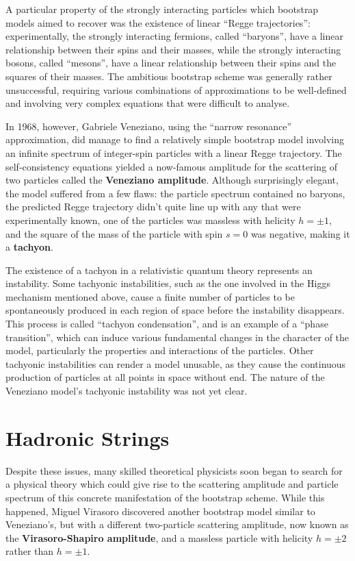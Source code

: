 \documentclass[12pt]{article}
\begin{document}
A particular property of the strongly interacting particles which bootstrap models aimed to recover was the existence of linear ``Regge trajectories'': experimentally, the strongly interacting fermions, called ``baryons'', have a linear relationship between their spins and their masses, while the strongly interacting bosons, called ``mesons'', have a linear relationship between their spins and the squares of their masses. The ambitious bootstrap scheme was generally rather unsuccessful, requiring various combinations of approximations to be well-defined and involving very complex equations that were difficult to analyse.
\newline

In 1968, however, Gabriele Veneziano, using the ``narrow resonance'' approximation, did manage to find a relatively simple bootstrap model involving an infinite spectrum of integer-spin particles with a linear Regge trajectory. The self-consistency equations yielded a now-famous amplitude for the scattering of two particles called the \textbf{Veneziano amplitude}. Although surprisingly elegant, the model suffered from a few flaws: the particle spectrum contained no baryons, the predicted Regge trajectory didn't quite line up with any that were experimentally known, one of the particles was massless with helicity $h = \pm 1$, and the square of the mass of the particle with spin $s=0$ was negative, making it a \textbf{tachyon}.
\newline

The existence of a tachyon in a relativistic quantum theory represents an instability. Some tachyonic instabilities, such as the one involved in the Higgs mechanism mentioned above, cause a finite number of particles to be spontaneously produced in each region of space before the instability disappears. This process is called ``tachyon condensation'', and is an example of a ``phase transition'', which can induce various fundamental changes in the character of the model, particularly the properties and interactions of the particles. Other tachyonic instabilities can render a model unusable, as they cause the continuous production of particles at all points in space without end. The nature of the Veneziano model's tachyonic instability was not yet clear.

\section{Hadronic Strings}

Despite these issues, many skilled theoretical physicists soon began to search for a physical theory which could give rise to the scattering amplitude and particle spectrum of this concrete manifestation of the bootstrap scheme. While this happened, Miguel Virasoro discovered another bootstrap model similar to Veneziano's, but with a different two-particle scattering amplitude, now known as the \textbf{Virasoro-Shapiro amplitude}, and a massless particle with helicity $h = \pm 2$ rather than $h = \pm 1$.
\newline
\end{document}
